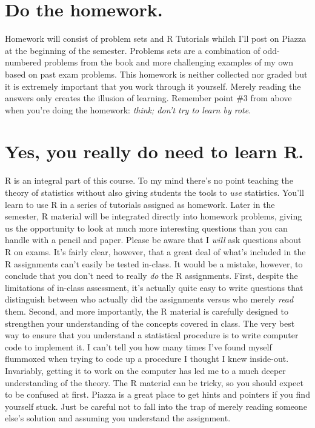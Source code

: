 \documentclass[12pt,letterpaper]{article}
\begin{document}
\section{Do the homework.}
Homework will consist of problem sets and R Tutorials whilch I'll post on Piazza at the beginning of the semester. Problems sets are a combination of
odd-numbered problems from the book and more challenging examples of my own based on past exam problems. This homework is neither collected nor graded but it is extremely important that you work through it yourself. Merely reading the answers only creates the illusion of learning. Remember point \#3 from above when you're doing the homework: \emph{think; don't try to learn by rote}.

\section{Yes, you really do need to learn R.}
R is an integral part of this course. To my mind there's no point teaching the theory of statistics without also giving students the tools to \emph{use} statistics. You'll learn to use R in a series of tutorials assigned as homework. Later in the semester, R material will be integrated directly into homework problems, giving us the opportunity to look at much more interesting questions than you can handle with a pencil and paper.  Please be aware that I \emph{will} ask questions about R on exams. It's fairly clear, however, that a great deal of what's included in the R assignments can't easily be tested in-class. It would be a mistake, however, to conclude that you don't need to really \emph{do} the R assignments. First, despite the limitations of in-class assessment, it's actually quite easy to write questions that distinguish between who actually did the assignments versus who merely \emph{read} them. Second, and more importantly, the R material is carefully designed to strengthen your understanding of the concepts covered in class. The very best way to ensure that you understand a statistical procedure is to write computer code to implement it. I can't tell you how many times I've found myself flummoxed when trying to code up a procedure I thought I knew inside-out. Invariably, getting it to work on the computer has led me to a much deeper understanding of the theory. The R material can be tricky, so you should expect to be confused at first. Piazza is a great place to get hints and pointers if you find yourself stuck. Just be careful not to fall into the trap of merely reading someone else's solution and assuming you understand the assignment.

 
\end{document}
